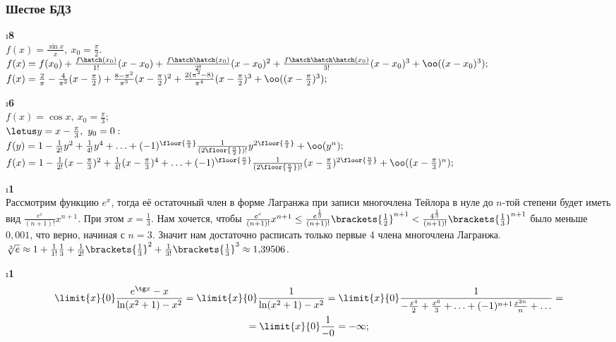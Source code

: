 \subsubsection{Шестое БДЗ}

\i\textbf{8}\\
$f(x) = \frac{\sin x}{x},\ x_0 = \frac{\pi}{2}$.\\
$f(x) = f(x_0) + \frac{f\hatch(x_0)}{1!}(x-x_0) + \frac{f\hatch\hatch(x_0)}{2!}(x-x_0)^2 + \frac{f\hatch\hatch\hatch(x_0)}{3!}(x-x_0)^3 + \oo((x-x_0)^3);$\\
$f(x) = \frac{2}{\pi} - \frac{4}{\pi^2}(x-\frac{\pi}{2}) + \frac{8-\pi^2}{\pi^3}(x-\frac{\pi}{2})^2 + \frac{2(\pi^2-8)}{\pi^4}(x-\frac{\pi}{2})^3 + \oo((x-\frac{\pi}{2})^3);$

\i\textbf{6}\\
$f(x) = \cos x,\ x_0 = \frac{\pi}{3};$\\
$\letus y = x - \frac{\pi}{3},\ y_0 = 0:$\\
$f(y) = 1 - \frac{1}{2!}y^2 + \frac{1}{4!}y^4 + \ldots + (-1)^{\floor{\frac{n}{2}}}\frac{1}{(2\floor{\frac{n}{2}})!}y^{2\floor{\frac{n}{2}}} + \oo(y^n);$\\
$f(x) = 1 - \frac{1}{2!}(x-\frac{\pi}{3})^2 + \frac{1}{4!}(x-\frac{\pi}{3})^4 + \ldots + (-1)^{\floor{\frac{n}{2}}}\frac{1}{(2\floor{\frac{n}{2}})!}(x-\frac{\pi}{3})^{2\floor{\frac{n}{2}}} + \oo((x-\frac{\pi}{3})^n);$


\i\textbf{1}\\
Рассмотрим функцию $e^x$, тогда её остаточный член в форме Лагранжа при записи многочлена Тейлора в нуле до $n$-той степени будет иметь вид $\frac{e^c}{(n+1)!}x^{n+1}$. При этом $x = \frac{1}{3}$. Нам хочется, чтобы $\frac{e^c}{(n+1)!}x^{n+1} \leq \frac{e^{\frac{1}{3}}}{(n+1)!}\brackets{\frac{1}{2}}^{n+1} < \frac{4^{\frac{1}{3}}}{(n+1)!}\brackets{\frac{1}{3}}^{n+1}$ было меньше $0{,}001$, что верно, начиная с $n=3$. Значит нам достаточно расписать только первые 4 члена многочлена Лагранжа.\\
$\sqrt[3]{e} \approx 1 + \frac{1}{1!}\frac{1}{3} + \frac{1}{2!}\brackets{\frac{1}{3}}^2 + \frac{1}{3!}\brackets{\frac{1}{3}}^3 \approx 1{,}39506$.

\i\textbf{1}\\
\begin{gather*}
    \limit{x}{0}\frac{e^{\tg x}-x}{\ln(x^2+1)-x^2} = \limit{x}{0} \frac{1}{\ln(x^2+1)-x^2} = \limit{x}{0} \frac{1}{-\frac{x^4}{2} + \frac{x^6}{3} + \ldots + (-1)^{n+1}\frac{x^{2n}}{n} + \ldots} = \\
    = \limit{x}{0}\frac{1}{-0} = -\infty;
\end{gather*}

